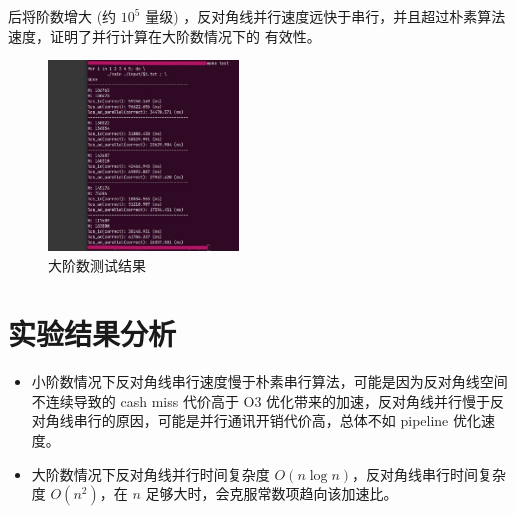 \documentclass[11pt]{article}
\begin{document}
后将阶数增大 (约 $ 10^5 $ 量级) ，反对角线并行速度远快于串行，并且超过朴素算法速度，证明了并行计算在大阶数情况下的
有效性。

\begin{figure}[H]
	\centering
	\includegraphics[width=0.45\textwidth]{./img/result-2.jpg}
	\caption{大阶数测试结果}
\end{figure}


\section{实验结果分析}

\begin{itemize}
	\item 小阶数情况下反对角线串行速度慢于朴素串行算法，可能是因为反对角线空间不连续导致的 cash miss 代价高于
	      O3 优化带来的加速，反对角线并行慢于反对角线串行的原因，可能是并行通讯开销代价高，总体不如 pipeline
	      优化速度。
	\item 大阶数情况下反对角线并行时间复杂度 $ O(n\log n) $，反对角线串行时间复杂度 $ O(n^2) $，在 $ n $
	      足够大时，会克服常数项趋向该加速比。
\end{itemize}
\end{document}
